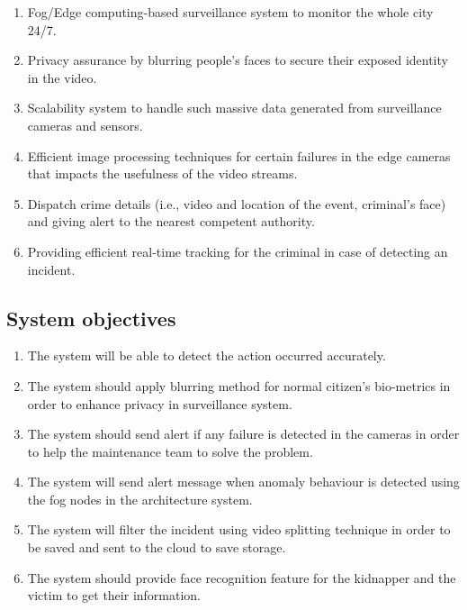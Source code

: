 \documentclass[12pt]{article}
\begin{document}
\begin{enumerate}
\item Fog/Edge computing-based surveillance system to monitor the whole city 24/7.

\item Privacy assurance by blurring people’s faces to secure their exposed identity in the video.
\item Scalability system to handle such massive data generated from surveillance cameras and sensors.
\item Efficient image processing techniques for certain failures in the edge cameras that impacts the usefulness of the video streams.
\item Dispatch crime details (i.e., video and location of the event, criminal’s face) and giving alert to the nearest competent authority.

\item Providing efficient real-time tracking for the criminal in case of detecting an incident.

\end{enumerate} 

\subsection{System objectives}
\begin{enumerate}


\item The system will be able to detect the action occurred accurately.

\item The system should apply blurring method for normal citizen’s bio-metrics in order to enhance privacy in surveillance system.
\item The system should send alert if any failure is detected in the cameras in order to help the maintenance team to solve the problem.
\item The system will send alert message when anomaly behaviour is detected using the fog nodes in the architecture system.

\item The system will filter the incident using video splitting technique in order to be saved and sent to the cloud to save storage.

\item The system should provide face recognition feature for the kidnapper and the victim to get their information.
 \end{enumerate}
 
\end{document}
